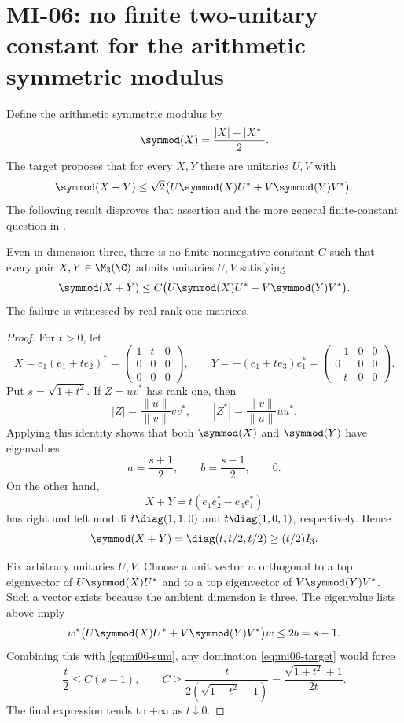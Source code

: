 \section{MI-06: no finite two-unitary constant for the arithmetic symmetric modulus}
\label{sec:mi06}

Define the arithmetic symmetric modulus by
\[
 \symmod(X)=\frac{|X|+|X^*|}{2}.
\]
The target proposes that for every $X,Y$ there are unitaries $U,V$ with
\[
 \symmod(X+Y)\leq\sqrt2\bigl(U\symmod(X)U^*+V\symmod(Y)V^*\bigr).
\]
The following result disproves that assertion and the more general finite-constant question in \cite[Conjecture 1.6 and equation (1.4)]{Zhang2026}.

\begin{theorem}\label{thm:mi06}
Even in dimension three, there is no finite nonnegative constant $C$ such that every pair $X,Y\in\M_3(\C)$ admits unitaries $U,V$ satisfying
\begin{equation}\label{eq:mi06-target}
 \symmod(X+Y)\leq C\bigl(U\symmod(X)U^*+V\symmod(Y)V^*\bigr).
\end{equation}
The failure is witnessed by real rank-one matrices.
\end{theorem}

\begin{proof}
For $t>0$, let
\[
 X=e_1(e_1+te_2)^*
 =\begin{pmatrix}1&t&0\\0&0&0\\0&0&0\end{pmatrix},\qquad
 Y=-(e_1+te_3)e_1^*
 =\begin{pmatrix}-1&0&0\\0&0&0\\-t&0&0\end{pmatrix}.
\]
Put $s=\sqrt{1+t^2}$. If $Z=uv^*$ has rank one, then
\[
 |Z|=\frac{\|u\|}{\|v\|}vv^*,\qquad
 |Z^*|=\frac{\|v\|}{\|u\|}uu^*.
\]
Applying this identity shows that both $\symmod(X)$ and $\symmod(Y)$ have eigenvalues
\[
 a=\frac{s+1}{2},\qquad b=\frac{s-1}{2},\qquad0.
\]
On the other hand,
\[
 X+Y=t(e_1e_2^*-e_3e_1^*)
\]
has right and left moduli $t\diag(1,1,0)$ and $t\diag(1,0,1)$, respectively. Hence
\begin{equation}\label{eq:mi06-sum}
 \symmod(X+Y)=\diag(t,t/2,t/2)\geq(t/2)I_3.
\end{equation}

Fix arbitrary unitaries $U,V$. Choose a unit vector $w$ orthogonal to a top eigenvector of $U\symmod(X)U^*$ and to a top eigenvector of $V\symmod(Y)V^*$. Such a vector exists because the ambient dimension is three. The eigenvalue lists above imply
\[
 w^*\bigl(U\symmod(X)U^*+V\symmod(Y)V^*\bigr)w\leq 2b=s-1.
\]
Combining this with \eqref{eq:mi06-sum}, any domination \eqref{eq:mi06-target} would force
\[
 \frac t2\leq C(s-1),\qquad
 C\geq\frac{t}{2(\sqrt{1+t^2}-1)}
 =\frac{\sqrt{1+t^2}+1}{2t}.
\]
The final expression tends to $+\infty$ as $t\downarrow0$.
\end{proof}


